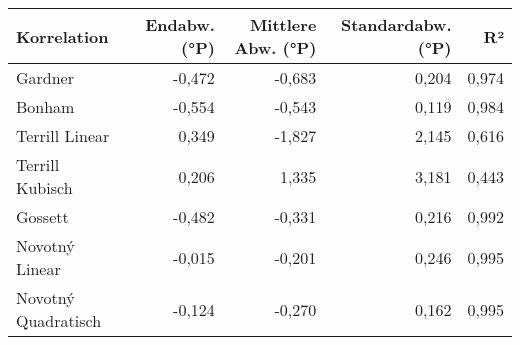 \begin{tabular}{lrrrr}
\toprule
        Korrelation &  Endabw. (°P) &  Mittlere Abw. (°P) &  Standardabw. (°P) &    R² \\
\midrule
            Gardner &        -0,472 &              -0,683 &              0,204 & 0,974 \\
             Bonham &        -0,554 &              -0,543 &              0,119 & 0,984 \\
     Terrill Linear &         0,349 &              -1,827 &              2,145 & 0,616 \\
    Terrill Kubisch &         0,206 &               1,335 &              3,181 & 0,443 \\
            Gossett &        -0,482 &              -0,331 &              0,216 & 0,992 \\
     Novotný Linear &        -0,015 &              -0,201 &              0,246 & 0,995 \\
Novotný Quadratisch &        -0,124 &              -0,270 &              0,162 & 0,995 \\
\bottomrule
\end{tabular}
